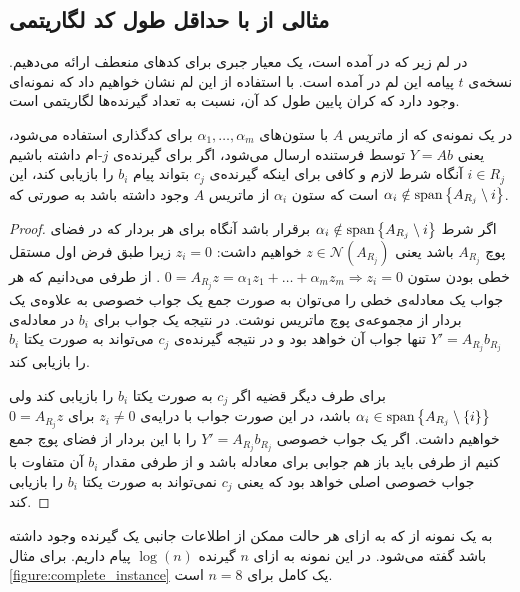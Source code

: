 \subsection{
    مثالی از
    \lpicod
    با حداقل طول کد لگاریتمی
}
در لم زیر که در
\cite{song2016deterministic}
آمده است، یک معیار جبری برای کدهای منعطف ارائه می‌دهیم. نسخه‌ی
$t$
پیامه این لم در
\cite{linqiphd}
آمده است. با استفاده از این لم نشان خواهیم داد که نمونه‌ای وجود دارد که کران پایین طول کد آن، نسبت به تعداد گیرنده‌ها لگاریتمی است.
\begin{lemma}
    \label{lemma:algebraicconstraint}
    در یک نمونه‌ی
    \lpicod
    که از ماتریس
    $A$
    با ستون‌های
    $\alpha_1, \ldots, \alpha_m$
    برای کدگذاری استفاده می‌شود، یعنی
    $Y = A b$
    توسط فرستنده ارسال می‌شود، اگر برای گیرنده‌ی
    $j$-ام داشته باشیم
    $i \in R_j$
    آنگاه شرط لازم و کافی برای اینکه گیرنده‌‌ی
    $c_j$
    بتواند پیام
    $b_i$
    را بازیابی کند، این است که ستون
    $\alpha_i$
    از ماتریس
    $A$
    وجود داشته باشد به صورتی که
    $\alpha_i \notin \operatorname{span} \left\{ A_{R_j} \setminus i \right\}$.
\end{lemma}
\begin{proof}
    اگر شرط
    $\alpha_i \notin \operatorname{span}\left\{ A_{R_j} \setminus i \right\}$
    برقرار باشد آنگاه برای هر بردار که در فضای پوچ
    $A_{R_j}$
    باشد یعنی
    $z \in \mathcal{N}(A_{R_j})$
    خواهیم داشت:
    $z_i = 0$
    زیرا طبق فرض اول مستقل خطی بودن ستون
    $0 = A_{R_j} z  = \alpha_1 z_1 + \ldots + \alpha_m z_m \Rightarrow z_i = 0$
    . از طرفی می‌دانیم که هر جواب یک معادله‌ی خطی را می‌توان به صورت جمع یک جواب خصوصی به علاوه‌ی یک بردار از مجموعه‌ی پوچ ماتریس نوشت. در نتیجه یک جواب برای
    $b_i$
    در معادله‌ی
    $Y' = A_{R_j} b_{R_j}$
    تنها جواب آن خواهد بود و در نتیجه گیرنده‌ی
    $c_j$
    می‌تواند به صورت یکتا
    $b_i$
    را بازیابی کند.

    برای طرف دیگر قضیه اگر
    $c_j$
    به صورت یکتا
    $b_i$
    را بازیابی کند ولی
    $\alpha_i \in \operatorname{span}\left\{ A_{R_j} \setminus \left\{ i \right\} \right\}$
    باشد، در این صورت جواب با درایه‌ی
    $z_i \neq 0$
    برای
    $0 = A_{R_j} z$
    خواهیم داشت. اگر یک جواب خصوصی
    $Y' = A_{R_j} b_{R_j}$
    را با این بردار از فضای پوچ جمع کنیم از طرفی باید باز هم جوابی برای معادله باشد و از طرفی مقدار
    $b_i$
    آن متفاوت با جواب خصوصی اصلی خواهد بود که یعنی
    $c_j$
    نمی‌تواند به صورت یکتا
    $b_i$
    را بازیابی کند.
\end{proof}
\begin{definition}
    به یک نمونه از
    \picod
    که به ازای هر حالت ممکن از اطلاعات جانبی یک گیرنده وجود داشته باشد گفته می‌شود. در این نمونه به ازای
    $n$
    گیرنده
    $\log(n)$
    پیام داریم. برای مثال
    \autoref{figure:complete_instance}
    یک
    \picod
    کامل برای
    $n= 8$
    است.
\end{definition}
